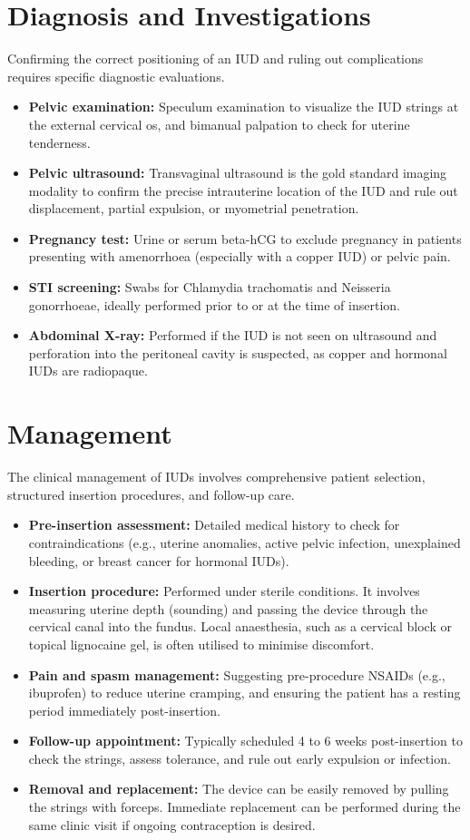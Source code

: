 \section*{Diagnosis and Investigations}
Confirming the correct positioning of an IUD and ruling out complications requires specific diagnostic evaluations.
\begin{itemize}
    \item \textbf{Pelvic examination:} Speculum examination to visualize the IUD strings at the external cervical os, and bimanual palpation to check for uterine tenderness.
    \item \textbf{Pelvic ultrasound:} Transvaginal ultrasound is the gold standard imaging modality to confirm the precise intrauterine location of the IUD and rule out displacement, partial expulsion, or myometrial penetration.
    \item \textbf{Pregnancy test:} Urine or serum beta-hCG to exclude pregnancy in patients presenting with amenorrhoea (especially with a copper IUD) or pelvic pain.
    \item \textbf{STI screening:} Swabs for Chlamydia trachomatis and Neisseria gonorrhoeae, ideally performed prior to or at the time of insertion.
    \item \textbf{Abdominal X-ray:} Performed if the IUD is not seen on ultrasound and perforation into the peritoneal cavity is suspected, as copper and hormonal IUDs are radiopaque.
\end{itemize}

\section*{Management}
The clinical management of IUDs involves comprehensive patient selection, structured insertion procedures, and follow-up care.
\begin{itemize}
    \item \textbf{Pre-insertion assessment:} Detailed medical history to check for contraindications (e.g., uterine anomalies, active pelvic infection, unexplained bleeding, or breast cancer for hormonal IUDs).
    \item \textbf{Insertion procedure:} Performed under sterile conditions. It involves measuring uterine depth (sounding) and passing the device through the cervical canal into the fundus. Local anaesthesia, such as a cervical block or topical lignocaine gel, is often utilised to minimise discomfort.
    \item \textbf{Pain and spasm management:} Suggesting pre-procedure NSAIDs (e.g., ibuprofen) to reduce uterine cramping, and ensuring the patient has a resting period immediately post-insertion.
    \item \textbf{Follow-up appointment:} Typically scheduled 4 to 6 weeks post-insertion to check the strings, assess tolerance, and rule out early expulsion or infection.
    \item \textbf{Removal and replacement:} The device can be easily removed by pulling the strings with forceps. Immediate replacement can be performed during the same clinic visit if ongoing contraception is desired.
\end{itemize}

